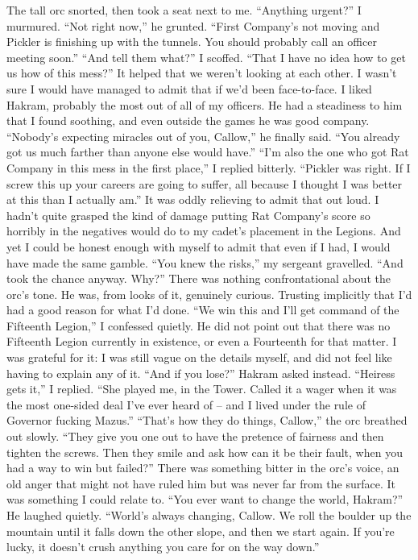 \documentclass[12pt, openany]{book}
\begin{document}
The tall orc snorted, then took a seat next to me.
“Anything urgent?” I murmured.
“Not right now,” he grunted. “First Company’s not moving and Pickler is finishing up with the tunnels. You should probably call an officer meeting soon.”
“And tell them what?” I scoffed. “That I have no idea how to get us how of this mess?”
It helped that we weren’t looking at each other. I wasn’t sure I would have managed to admit that if we’d been face-to-face. I liked Hakram, probably the most out of all of my officers. He had a steadiness to him that I found soothing, and even outside the games he was good company.
“Nobody’s expecting miracles out of you, Callow,” he finally said. “You already got us much farther than anyone else would have.”
“I’m also the one who got Rat Company in this mess in the first place,” I replied bitterly. “Pickler was right. If I screw this up your careers are going to suffer, all because I thought I was better at this than I actually am.”
It was oddly relieving to admit that out loud. I hadn’t quite grasped the kind of damage putting Rat Company’s score so horribly in the negatives would do to my cadet’s placement in the Legions. And yet I could be honest enough with myself to admit that even if I had, I would have made the same gamble.
“You knew the risks,” my sergeant gravelled. “And took the chance anyway. Why?”
There was nothing confrontational about the orc’s tone. He was, from looks of it, genuinely curious. Trusting implicitly that I’d had a good reason for what I’d done.
“We win this and I’ll get command of the Fifteenth Legion,” I confessed quietly.
He did not point out that there was no Fifteenth Legion currently in existence, or even a Fourteenth for that matter. I was grateful for it: I was still vague on the details myself, and did not feel like having to explain any of it.
“And if you lose?” Hakram asked instead.
“Heiress gets it,” I replied. “She played me, in the Tower. Called it a wager when it was the most one-sided deal I’ve ever heard of – and I lived under the rule of Governor fucking Mazus.”
“That’s how they do things, Callow,” the orc breathed out slowly. “They give you one out to have the pretence of fairness and then tighten the screws. Then they smile and ask how can it be their fault, when you had a way to win but failed?”
There was something bitter in the orc’s voice, an old anger that might not have ruled him but was never far from the surface. It was something I could relate to.
“You ever want to change the world, Hakram?”
He laughed quietly. “World’s always changing, Callow. We roll the boulder up the mountain until it falls down the other slope, and then we start again. If you’re lucky, it doesn’t crush anything you care for on the way down.”
\end{document}
